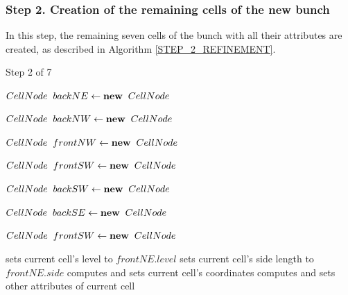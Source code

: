 \subsubsection*{Step 2. Creation of the remaining cells of the new bunch} \label{SUBSEC_REFINEMENT_STEP2}
In this step, the remaining seven cells of the bunch with all their
attributes are created, as described in Algorithm
\ref{STEP_2_REFINEMENT}.

\begin{algorithm}[!h]
    \caption{Step 2 of 7}
    \small{
    \begin{algorithmic}[1]
        \State $CellNode \hspace{2mm} backNE \gets \textbf{new} \hspace{2mm} CellNode$

        \State $CellNode \hspace{2mm} backNW \gets \textbf{new} \hspace{2mm} CellNode$

        \State $CellNode \hspace{2mm} frontNW \gets \textbf{new} \hspace{2mm} CellNode$

        \State $CellNode \hspace{2mm} frontSW \gets \textbf{new} \hspace{2mm} CellNode$

        \State $CellNode \hspace{2mm} backSW \gets \textbf{new} \hspace{2mm} CellNode$

        \State $CellNode \hspace{2mm} backSE \gets \textbf{new} \hspace{2mm} CellNode$

        \State $CellNode \hspace{2mm} frontSW \gets \textbf{new} \hspace{2mm} CellNode$

        \State
            \State sets current cell's level to $frontNE.level$
            \State sets current cell's side length to $frontNE.side$
            \State computes and sets current cell's coordinates
            \State computes and sets other attributes of current
            cell
        \EndFor


\end{algorithmic}}
\end{algorithm}
